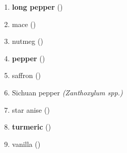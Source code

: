 \begin{multicols}{2}
\begin{enumerate}
    \item \textbf{long pepper} () \quad \hfill \pageref{sec:long_pepper}
    \item mace () %
    \item nutmeg () %
	\item \textbf{pepper} () \quad \hfill \pageref{sec:pepper}
    \item saffron () %
    \item Sichuan pepper \textit{(Zanthoxylum spp.)} %
    \item star anise () %
    \item \textbf{turmeric} () \quad \hfill \pageref{sec:turmeric}
    \item vanilla () %
\end{enumerate}
\end{multicols}

\setlength{\tabcolsep}{4pt}

